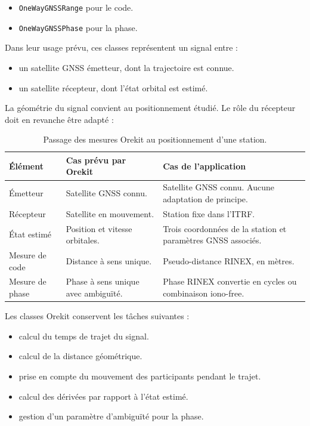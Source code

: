 \begin{itemize}
    \item \texttt{OneWayGNSSRange} pour le code.
    \item \texttt{OneWayGNSSPhase} pour la phase.
\end{itemize}

Dans leur usage prévu, ces classes représentent un signal entre :

\begin{itemize}
    \item un satellite GNSS émetteur, dont la trajectoire est connue.
    \item un satellite récepteur, dont l'état orbital est estimé.
\end{itemize}

La géométrie du signal convient au positionnement étudié. Le rôle du récepteur
doit en revanche être adapté :

\begin{table}[htbp]
\centering
\small
\begin{tabularx}{\textwidth}{|>{\raggedright\arraybackslash}p{}|
                                  >{\raggedright\arraybackslash}p{}|
                                  >{\raggedright\arraybackslash}X|}
\hline
\textbf{Élément} & \textbf{Cas prévu par Orekit} &
\textbf{Cas de l'application} \\
\hline
Émetteur & Satellite GNSS connu. & Satellite GNSS connu. Aucune adaptation de
principe. \\
\hline
Récepteur & Satellite en mouvement. & Station fixe dans l'ITRF. \\
\hline
État estimé & Position et vitesse orbitales. & Trois coordonnées de la station
et paramètres GNSS associés. \\
\hline
Mesure de code & Distance à sens unique. & Pseudo-distance RINEX, en mètres. \\
\hline
Mesure de phase & Phase à sens unique avec ambiguïté. & Phase RINEX convertie
en cycles ou combinaison iono-free. \\
\hline
\end{tabularx}
\caption{Passage des mesures Orekit au positionnement d'une station.}
\label{tab:one_way_adaptation}
\end{table}

Les classes Orekit conservent les tâches suivantes :

\begin{itemize}
    \item calcul du temps de trajet du signal.
    \item calcul de la distance géométrique.
    \item prise en compte du mouvement des participants pendant le trajet.
    \item calcul des dérivées par rapport à l'état estimé.
    \item gestion d'un paramètre d'ambiguïté pour la phase.
\end{itemize}

